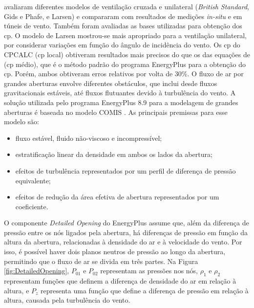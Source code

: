 \documentclass[brazil,hardcopy,openany]{ufscthesis} %
\begin{document}
 avaliaram diferentes modelos de ventilação cruzada e unilateral (\textit{British Standard}, Gids e Phafe, e Larsen) e compararam com resultados de medições \textit{in-situ} e em túneis de vento. Também foram avaliadas as bases utilizadas para obtenção dos \acrshort{cp}. 
O modelo de Larsen mostrou-se mais apropriado para a ventilação unilateral, por considerar variações em função do ângulo de incidência do vento. Os \acrshort{cp} do CPCALC (\acrshort{cp} local) obtiveram resultados mais precisos do que os das equações de  (\acrshort{cp} médio), que é o método padrão do programa EnergyPlus \cite{EnergyPlus2018} para a obtenção do \acrshort{cp}. Porém, ambos obtiveram erros relativos por volta de 30\%. O fluxo de ar por grandes aberturas envolve diferentes obstáculos, que inclui desde fluxos gravitacionais estáveis, até fluxos flutuantes devido à turbulência do vento. A solução utilizada pelo programa EnergyPlus 8.9 \cite{EnergyPlus2018} para a modelagem de grandes aberturas é baseada no modelo COMIS \cite{Feustel1990}. As principais premissas para esse modelo são:

\begin{itemize}
	\item fluxo estável, fluido não-viscoso e incompressível;
	\item estratificação linear da densidade em ambos os lados da abertura;
	\item efeitos de turbulência representados por um perfil de diferença de pressão equivalente;
	\item efeitos de redução da área efetiva de abertura representados por um coeficiente.
\end{itemize}

O componente \textit{Detailed Opening} do EnergyPlus \cite{EnergyPlus2018} assume que, além da diferença de pressão entre os nós ligados pela abertura, há diferenças de pressão em função da altura da abertura, relacionadas à densidade do ar e à velocidade do vento. Por isso, é possível haver dois planos neutros de pressão ao longo da abertura, permitindo que o fluxo de ar se divida em três partes. 
Na Figura \ref{fig:DetailedOpening}, $P_{01}$ e $P_{02}$ representam as pressões nos nós, $\rho_{1}$ e $\rho_{2}$ representam funções que definem a diferença de densidade do ar em relação à altura, e $P_z$ representa uma função que define a diferença de pressão em relação à altura, causada pela turbulência do vento.
\end{document}
